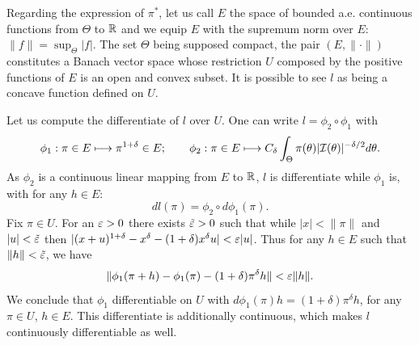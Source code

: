 



Regarding the expression of $\pi^\ast$,
let us call $E$ the space of bounded a.e. continuous functions from $\Theta$ to $\mathbb{R}$ and we equip $E$ with the supremum norm over $E$: $\|f\|=\sup_\Theta|f|$. The set $\Theta$ being supposed compact, the pair $(E,\|\cdot\|)$ constitutes a Banach vector space whose restriction $U$ composed by the positive functions of $E$ is an open and convex subset.
It is possible to see $l$ as being a concave function defined on $U$.


Let us compute the differentiate of $l$ over $U$. One can write $l=\phi_2\circ\phi_1$ with
\begin{equation}
    \phi_1:\pi\in E\longmapsto \pi^{1+\delta}\in E ;\qquad \phi_2:\pi\in E\longmapsto C_\delta \int_\Theta \pi(\theta)|\mathcal{I}(\theta)|^{-\delta/2}d\theta.
\end{equation}
As $\phi_2$ is a continuous linear mapping from $E$ to $\mathbb{R}$, $l$ is differentiate while $\phi_1$ is, with for any $h\in E$:
    \begin{equation}
        dl(\pi) = \phi_2\circ d\phi_1(\pi).
    \end{equation}
Fix $\pi\in U$. For an $\varepsilon>0$ there exists $\tilde{\varepsilon}>0$ such that while $|x|<\|\pi\|$ and $|u|<\tilde{\varepsilon}$ then $|(x+u)^{1+\delta}-x^\delta-(1+\delta)x^\delta u|<\varepsilon|u|$. Thus for any $h\in E$ such that $\|h\|<\tilde{\varepsilon}$, we have
    \begin{equation}
        \|\phi_1(\pi+h) -\phi_1(\pi)-(1+\delta)\pi^\delta h\|<\varepsilon\|h\|.
    \end{equation}
We conclude that $\phi_1$ differentiable on $U$ with $d\phi_1(\pi)h = (1+\delta)\pi^\delta h$, for any $\pi\in U$, $h\in E$. This differentiate is additionally continuous, which makes $l$ continuously differentiable as well.

